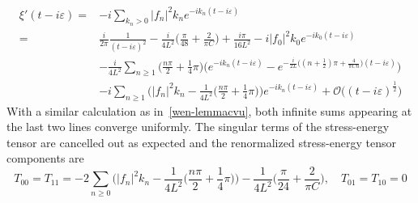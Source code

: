 \begin{equation*}
\begin{split}
\xi'(t  - i\varepsilon)  = & -i\sum_{k_n>0}|f_n|^2k_n e^{-ik_n(t-i\varepsilon)} \\
%
= & \frac{i}{2\pi}\frac{1}{(t-i\varepsilon)^2}  
-\frac{i}{4L^2}\big(\frac{\pi}{48} + \frac{2}{\pi C} \big)
+ \frac{i\pi}{16 L^2}
- i |f_0|^2k_0e^{-ik_0(t-i\varepsilon)}
\\
% 
& -\frac{i}{4L^2}\sum_{n\geq1}\Big(\frac{n\pi}{2} + \frac 1 4 \pi\Big)
\bigg(e^{-ik_n(t-i\varepsilon)}
-e^{-\frac{i}{2L}\big((n+\frac 1 2 )\pi + \frac{4}{\pi C n} \big)(t-i\varepsilon)} \bigg) \\
&-i \sum_{n \geq 1} \Big( |f_n|^2 k_n - \frac{1}{4L^2}\big(\frac{n\pi}{2} + \frac 1 4 \pi \big) \Big) e^{-ik_n(t-i\varepsilon)}
+\mathcal{O}\big((t-i\varepsilon)^{\frac{1}{2}}\big)
\end{split}
\end{equation*}
With a similar calculation as in~\cref{wen-lemmacvu}, both infinite sums appearing at the last two lines converge uniformly.
The singular terms of the stress-energy tensor are cancelled out as expected and the renormalized stress-energy tensor components are
\begin{equation*}
T_{00} = T_{11}= - 2 \sum_{n\geq 0} \Big( |f_n|^2 k_n - 
\frac{1}{4L^2}\big(\frac{n\pi}{2} + \frac 1 4 \pi \big) \Big)
-\frac{1}{4L^2}\big(\frac{\pi}{24} + \frac{2}{\pi C}\big)
 , \quad
T_{01}=T_{10}  = 0
\end{equation*}










